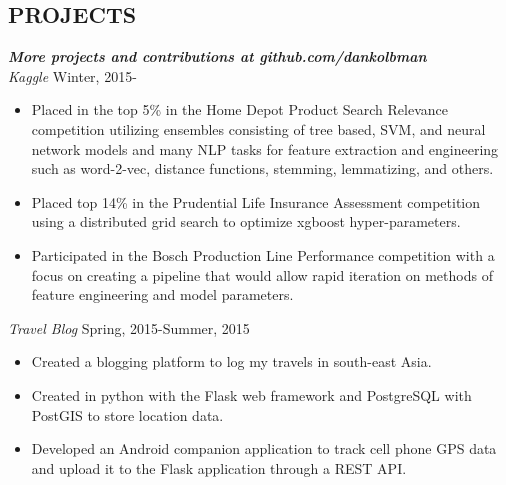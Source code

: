 \documentclass[margin]{res}
\begin{document}
\begin{resume}


\section{PROJECTS}
  {\sl \textbf{More projects and contributions at github.com/dankolbman}}\\
  {\sl Kaggle} \hfill            Winter, 2015- \\
  \begin{itemize}
    \item Placed in the top 5\% in the Home Depot Product Search Relevance competition utilizing ensembles consisting of tree based, SVM, and neural network models and many NLP tasks for feature extraction and engineering such as word-2-vec, distance functions, stemming, lemmatizing, and others.
    \item Placed top 14\% in the Prudential Life Insurance Assessment competition using a distributed grid search to optimize xgboost hyper-parameters.
    \item Participated in the Bosch Production Line Performance competition with a focus on creating a pipeline that would allow rapid iteration on methods of feature engineering and model parameters.
  \end{itemize}
  {\sl Travel Blog} \hfill            Spring, 2015-Summer, 2015 \\
  \begin{itemize}
    \item Created a blogging platform to log my travels in south-east Asia.
    \item Created in python with the Flask web framework and PostgreSQL with
      PostGIS to store location data.
    \item Developed an Android companion application to track cell phone GPS data
      and upload it to the Flask application through a REST API.
  \end{itemize}
      

\end{resume}
\end{document}
